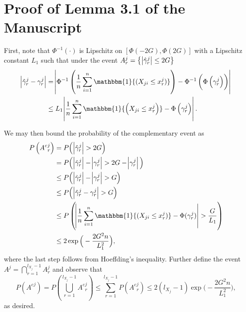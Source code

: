 \section{Proof of Lemma 3.1 of the Manuscript %
}\label{lemma_threshold_proof}

First, note that $\Phi^{-1}(\cdot)$ is Lipschitz on $[\Phi(-2G),\Phi(2G)]$ with a Lipschitz constant $L_1$ such that under the event $A_r^j = \big\{\abs{\hat{\gamma}^j_r} \leq 2G\big\}$
\begin{equation*}
    \begin{split}
        \abs{\hat{\gamma}_r^j - \gamma_r^j} &= \abs{\Phi^{-1}\left(\frac{1}{n} \sum_{i=1}^n \mathbbm{1}{(X_{ji} \leq x_r^j)}\right) - \Phi^{-1}\left(\Phi\left(\gamma_r^j\right)\right)} \\
        &\leq L_1\abs{\frac{1}{n} \sum_{i=1}^n \mathbbm{1}{\left(X_{ji} \leq x_r^j\right)} - \Phi\left(\gamma_r^j\right)}.
    \end{split}
\end{equation*}

We may then bound the probability of the complementary event as
\begin{equation*}
\begin{split}
    P\left({A^c}_{r}^{j}\right) &= P\Big(\abs{\hat{\gamma}^j_r} > 2G\Big) \\
                     &= P\Big(\abs{\hat{\gamma}^j_r} - \abs{\gamma^j_r} > 2G - \abs{\gamma^j_r}\Big) \\
                     &\leq P\Big(\abs{\hat{\gamma}^j_r} - \abs{\gamma^j_r} > G\Big) \\
                     &\leq P\Big(\abs{\hat{\gamma}^j_r - \gamma^j_r} > G\Big) \\
                     &\leq P\left(\abs{\frac{1}{n} \sum_{i=1}^n \mathbbm{1}{(X_{ji} \leq x_r^j)} - \Phi(\gamma_r^j)} > \frac{G}{L_1}\right) \\ 
                     &\leq 2\exp{\Big(- \frac{2G^2n}{L_1^2}\Big)},
\end{split} 
\end{equation*}
where the last step follows from Hoeffding's inequality. Further define the event $A^j = \bigcap_{r=1}^{l_{X_j}-1} A_r^j$ and observe that
\begin{equation*}
    P\left({A^c}^j\right) = P\left(\bigcup_{r=1}^{l_{X_j}-1} {A^c}_r^j\right) \leq \sum_{r=1}^{l_{X_j}-1} P({A^c}_r^j) \leq 2(l_{X_j}-1)\exp{\Big(- \frac{2G^2n}{L_1^2}\Big)},
\end{equation*}
as desired. 


